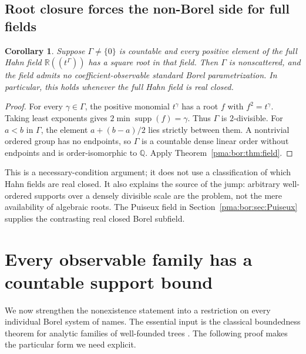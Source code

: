 \documentclass[11pt]{article}
\numberwithin{equation}{section}
\newtheorem{corollary}[corollary]{Corollary}
\theoremstyle{definition}
\theoremstyle{remark}
\newcommand{\Q}{\mathbb Q}
\newcommand{\R}{\mathbb R}
\newcommand{\supp}{\operatorname{supp}}
\begin{document}
\subsection{Root closure forces the non-Borel side for full fields}

\begin{corollary}
\label{pma:bor:cor:rootjump}
Suppose $\Gamma\ne\{0\}$ is countable and every positive element of the
full Hahn field $\R((t^\Gamma))$ has a square root in that field. Then
$\Gamma$ is nonscattered, and the field admits no coefficient-observable
standard Borel parametrization. In particular, this holds whenever the full
Hahn field is real closed.
\end{corollary}
\begin{proof}
For every $\gamma\in\Gamma$, the positive monomial $t^\gamma$ has a root
$f$ with $f^2=t^\gamma$. Taking least exponents gives
$2\min\supp(f)=\gamma$. Thus $\Gamma$ is $2$-divisible. For $a<b$ in
$\Gamma$, the element $a+(b-a)/2$ lies strictly between them. A nontrivial
ordered group has no endpoints, so $\Gamma$ is a countable dense linear order
without endpoints and is order-isomorphic to $\Q$. Apply
Theorem~\ref{pma:bor:thm:field}.
\end{proof}

This is a necessary-condition argument; it does not use a classification of
which Hahn fields are real closed. It also explains the source of the jump:
arbitrary well-ordered supports over a densely divisible scale are the
problem, not the mere availability of algebraic roots. The Puiseux field in
Section~\ref{pma:bor:sec:Puiseux} supplies the contrasting real closed Borel subfield.

\section{Every observable family has a countable support bound}
\label{pma:bor:sec:rank}

We now strengthen the nonexistence statement into a restriction on every
individual Borel system of names. The essential input is the classical
boundedness theorem for analytic families of well-founded trees
\cite{Kechris}. The following proof makes the particular form we need explicit.
\end{document}
